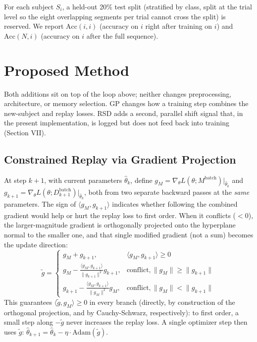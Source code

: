 \documentclass[conference]{IEEEtran}
\begin{document}
For each subject $S_i$, a held-out 20\% test split (stratified by class, split at the trial level so the eight overlapping segments per trial cannot cross the split) is reserved. We report $\mathrm{Acc}(i,i)$ (accuracy on $i$ right after training on $i$) and $\mathrm{Acc}(N,i)$ (accuracy on $i$ after the full sequence).

\section{Proposed Method}

Both additions sit on top of the loop above; neither changes preprocessing, architecture, or memory selection. GP changes how a training step combines the new-subject and replay losses. RSD adds a second, parallel shift signal that, in the present implementation, is logged but does not feed back into training (Section VII).

\subsection{Constrained Replay via Gradient Projection}
\label{sec:gp}
At step $k{+}1$, with current parameters $\hat\theta_k$, define $g_M=\nabla_\theta L(\theta;M^{\mathrm{batch}})|_{\hat\theta_k}$ and $g_{k+1}=\nabla_\theta L(\theta;D_{k+1}^{\mathrm{batch}})|_{\hat\theta_k}$, both from two separate backward passes at the \emph{same} parameters. The sign of $\langle g_M,g_{k+1}\rangle$ indicates whether following the combined gradient would help or hurt the replay loss to first order. When it conflicts ($<0$), the larger-magnitude gradient is orthogonally projected onto the hyperplane normal to the smaller one, and that single modified gradient (not a sum) becomes the update direction:
\begin{equation}
\tilde g =
\begin{cases}
g_M + g_{k+1}, & \langle g_M, g_{k+1}\rangle \geq 0 \\[2pt]
g_M - \frac{\langle g_M, g_{k+1}\rangle}{\lVert g_{k+1}\rVert^2} g_{k+1}, & \text{conflict}, \lVert g_M\rVert \geq \lVert g_{k+1}\rVert \\[2pt]
g_{k+1} - \frac{\langle g_M, g_{k+1}\rangle}{\lVert g_M\rVert^2} g_M, & \text{conflict}, \lVert g_M\rVert < \lVert g_{k+1}\rVert
\end{cases}
\label{eq:projection}
\end{equation}
This guarantees $\langle\tilde g,g_M\rangle\geq0$ in every branch (directly, by construction of the orthogonal projection, and by Cauchy-Schwarz, respectively): to first order, a small step along $-\tilde g$ never increases the replay loss. A single optimizer step then uses $\tilde g$: $\hat\theta_{k+1}=\hat\theta_k-\eta\cdot\mathrm{Adam}(\tilde g)$.
\end{document}
